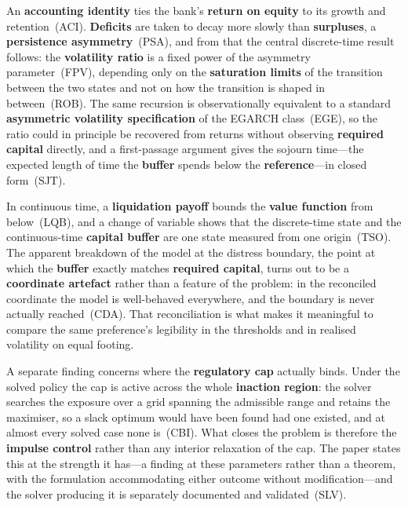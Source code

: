 \documentclass[11pt]{article}
\begin{document}
An \textbf{accounting identity} ties the bank's \textbf{return on equity} to its growth and
retention~(ACI). \textbf{Deficits} are taken to decay more slowly than \textbf{surpluses}, a
\textbf{persistence asymmetry}~(PSA), and from that the central discrete-time
result follows: the \textbf{volatility ratio} is a fixed power of the asymmetry
parameter~(FPV), depending only on the \textbf{saturation limits} of the transition
between the two states and not on how the transition is shaped in
between~(ROB). The same recursion is observationally equivalent to a
standard \textbf{asymmetric volatility specification} of the EGARCH class~(EGE), so
the ratio could in principle be recovered from returns without observing
\textbf{required capital} directly, and a first-passage argument gives the sojourn
time---the expected length of time the \textbf{buffer} spends below the
\textbf{reference}---in closed form~(SJT).

In continuous time, a \textbf{liquidation payoff} bounds the \textbf{value function} from
below~(LQB), and a change of variable shows that the discrete-time state
and the continuous-time \textbf{capital buffer} are one state measured from one
origin~(TSO). The apparent breakdown of the model at the distress
boundary, the point at which the \textbf{buffer} exactly matches \textbf{required capital},
turns out to be a \textbf{coordinate artefact} rather than a feature of the
problem: in the reconciled coordinate the model is well-behaved
everywhere, and the boundary is never actually reached~(CDA). That
reconciliation is what makes it meaningful to compare the same
preference's legibility in the thresholds and in realised volatility on
equal footing.

A separate finding concerns where the \textbf{regulatory cap} actually binds. Under
the solved policy the cap is active across the whole \textbf{inaction region}: the
solver searches the exposure over a grid spanning the admissible range and
retains the maximiser, so a slack optimum would have been found had one
existed, and at almost every solved case none is~(CBI). What closes the
problem is therefore the \textbf{impulse control} rather than any interior
relaxation of the cap. The paper states this at the strength it has---a
finding at these parameters rather than a theorem, with the formulation
accommodating either outcome without modification---and the solver
producing it is separately documented and validated~(SLV).
\end{document}
